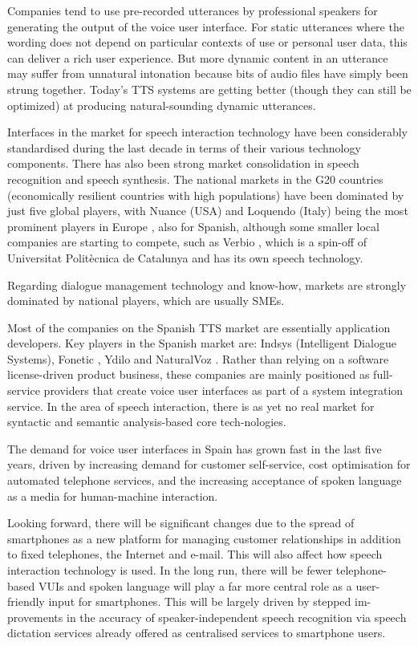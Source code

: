 \begin{multicols}{2}
Companies tend to use pre-recorded utterances by professional speakers for generating the output of the voice user interface. For static utterances where the wording does not depend on particular contexts of use or personal user data, this can deliver a rich user experience. But more dynamic content in an utterance may suffer from unnatural intonation because bits of audio files have simply been strung together. Today’s TTS systems are getting better (though they can still be optimized) at producing natural-sounding dynamic utterances.  

Interfaces in the market for speech interaction technology have been considerably standardised during the last decade in terms of their various technology components. There has also been strong market consolidation in speech recognition and speech synthesis. The national markets in the G20 countries (economically resilient countries with high populations) have been dominated by just five global players, with Nuance (USA) and Loquendo (Italy) being the most prominent players in Europe , also for Spanish, although some smaller local companies are starting to compete, such as Verbio , which is a spin-off of Universitat Politècnica de Catalunya and has its own speech technology. 

Regarding dialogue management technology and know-how, markets are strongly dominated by national players, which are usually SMEs.

Most of the companies on the Spanish TTS market are essentially application developers. Key players in the Spanish market are: Indsys  (Intelligent Dialogue Systems), Fonetic , Ydilo  and NaturalVoz . Rather than relying on a software license-driven product business, these companies are mainly positioned as full-service providers that create voice user interfaces as part of a system integration service. In the area of speech interaction, there is as yet no real market for syntactic and semantic analysis-based core tech-nologies.

The demand for voice user interfaces in Spain has grown fast in the last five years, driven by increasing demand for customer self-service, cost optimisation for automated telephone services, and the increasing acceptance of spoken language as a media for human-machine interaction. 

Looking forward, there will be significant changes due to the spread of smartphones as a new platform for managing customer relationships in addition to fixed telephones, the Internet and e-mail. This will also affect how speech interaction technology is used. In the long run, there will be fewer telephone-based VUIs and spoken language will play a far more central role as a user-friendly input for smartphones. This will be largely driven by stepped im-provements in the accuracy of speaker-independent speech recognition via speech dictation services already offered as centralised services to smartphone users.


\end{multicols}
